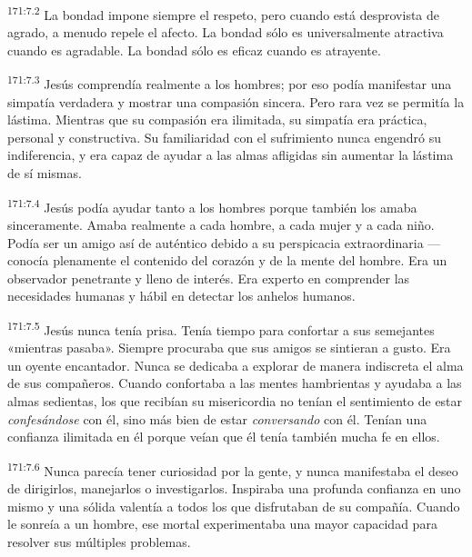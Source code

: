 \par 
\textsuperscript{171:7.2} La bondad impone siempre el respeto, pero cuando está desprovista de agrado, a menudo repele el afecto. La bondad sólo es universalmente atractiva cuando es agradable. La bondad sólo es eficaz cuando es atrayente.

\par 
\textsuperscript{171:7.3} Jesús comprendía realmente a los hombres; por eso podía manifestar una simpatía verdadera y mostrar una compasión sincera. Pero rara vez se permitía la lástima. Mientras que su compasión era ilimitada, su simpatía era práctica, personal y constructiva. Su familiaridad con el sufrimiento nunca engendró su indiferencia, y era capaz de ayudar a las almas afligidas sin aumentar la lástima de sí mismas.

\par 
\textsuperscript{171:7.4} Jesús podía ayudar tanto a los hombres porque también los amaba sinceramente. Amaba realmente a cada hombre, a cada mujer y a cada niño. Podía ser un amigo así de auténtico debido a su perspicacia extraordinaria ---conocía plenamente el contenido del corazón y de la mente del hombre. Era un observador penetrante y lleno de interés. Era experto en comprender las necesidades humanas y hábil en detectar los anhelos humanos.

\par 
\textsuperscript{171:7.5} Jesús nunca tenía prisa. Tenía tiempo para confortar a sus semejantes «mientras pasaba». Siempre procuraba que sus amigos se sintieran a gusto. Era un oyente encantador. Nunca se dedicaba a explorar de manera indiscreta el alma de sus compañeros. Cuando confortaba a las mentes hambrientas y ayudaba a las almas sedientas, los que recibían su misericordia no tenían el sentimiento de estar \textit{confesándose} con él, sino más bien de estar \textit{conversando} con él. Tenían una confianza ilimitada en él porque veían que él tenía también mucha fe en ellos.

\par 
\textsuperscript{171:7.6} Nunca parecía tener curiosidad por la gente, y nunca manifestaba el deseo de dirigirlos, manejarlos o investigarlos. Inspiraba una profunda confianza en uno mismo y una sólida valentía a todos los que disfrutaban de su compañía. Cuando le sonreía a un hombre, ese mortal experimentaba una mayor capacidad para resolver sus múltiples problemas.

